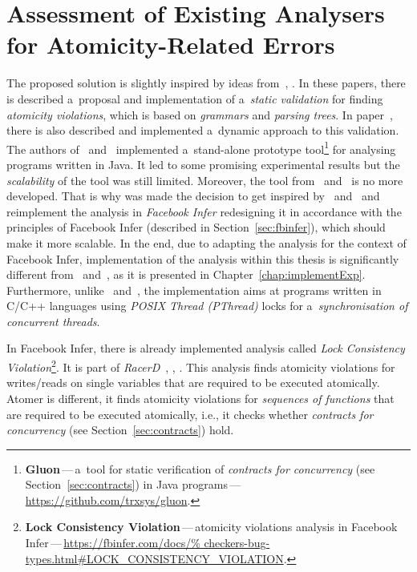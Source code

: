 \section{Assessment of Existing Analysers for Atomicity-Related Errors}
\label{sec:existAnalysers}

The proposed solution is slightly inspired by ideas from~\cite{contracts2017},
\cite{contracts2015}. In these papers, there is described a~proposal
and implementation of a~\emph{static validation} for finding
\emph{atomicity violations}, which is based on \emph{grammars} and
\emph{parsing trees}. In paper~\cite{contracts2017}, there is also described
and implemented a~dynamic approach to this validation. The authors
of~\cite{contracts2017} and~\cite{contracts2015} implemented a~stand-alone
prototype tool\footnote{\textbf{Gluon}\,---\,a~tool for static verification of
\emph{contracts for concurrency} (see Section~\ref{sec:contracts}) in Java
programs\,---\,\url{https://github.com/trxsys/gluon}.} for analysing programs
written in Java. It led to some promising experimental results but the
\emph{scalability} of the tool was still limited. Moreover, the tool
from~\cite{contracts2017} and~\cite{contracts2015} is no more developed. That
is why was made the decision to get inspired by~\cite{contracts2017}
and~\cite{contracts2015} and reimplement the analysis in \emph{Facebook Infer}
redesigning it in accordance with the principles of Facebook Infer (described in
Section~\ref{sec:fbinfer}), which should make it more scalable. In the end, due
to adapting the analysis for the context of Facebook Infer, implementation of
the analysis within this thesis is significantly different
from~\cite{contracts2017} and~\cite{contracts2015}, as it is presented in
Chapter~\ref{chap:implementExp}. Furthermore, unlike~\cite{contracts2017}
and~\cite{contracts2015}, the implementation aims at programs written
in C/C++ languages using \emph{POSIX Thread (PThread)} locks for
a~\emph{synchronisation of concurrent threads}.

In Facebook Infer, there is already implemented analysis called
\emph{Lock Consistency Violation}\footnote{\textbf{Lock Consistency
Violation}\,---\,atomicity violations analysis in Facebook
Infer\,---\,\url{https://fbinfer.com/docs/%
checkers-bug-types.html\#LOCK_CONSISTENCY_VIOLATION}.}. It is part of
\emph{RacerD}~\cite{racerD}, \cite{racerDOnline},
\cite{staticRaceDetectorTruePositive}. This analysis finds atomicity
violations for writes/reads on single variables that are required to
be executed atomically. Atomer is different, it finds atomicity
violations for \emph{sequences of functions} that are required to be
executed atomically, i.e., it checks whether \emph{contracts for
concurrency} (see Section~\ref{sec:contracts}) hold.


